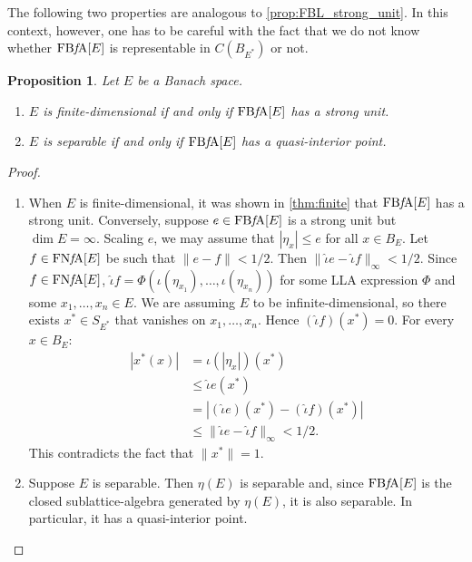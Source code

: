 \documentclass{memo-l}
\newtheorem{prop}[theorem]{Proposition}
\theoremstyle{definition}
\theoremstyle{remark}
\numberwithin{section}{chapter}
\numberwithin{equation}{chapter}
\newcommand{\FNFA}[1]{\operatorname{FN{\it f}\!A}[#1]}
\newcommand{\FBFA}[1]{\operatorname{FB{\it f}\!A}[#1]}
\begin{document}
The following two properties are analogous to
\cref{prop:FBL_strong_unit}. In this context, however, one has to
be careful with the fact that we do not know whether $\FBFA E$ is
representable in $C(B_{E^{*}})$ or not.

\begin{prop} Let $E$ be a Banach space.
    \begin{enumerate}
        \item $E$ is finite-dimensional if and only if $\FBFA E$ has a
            strong unit.
        \item $E$ is separable if and only if $\FBFA E$ has a quasi-interior point.
    \end{enumerate}
\end{prop}
\begin{proof}
    \begin{enumerate}
        \item When $E$ is finite-dimensional, it was shown in
            \cref{thm:finite} that $\FBFA E$ has a strong unit.
            Conversely, suppose $e \in \FBFA E$ is a strong unit but
            $\dim E=\infty$. Scaling $e$, we may assume that $|\eta _x|\le
            e$ for all $x \in B_E$. Let
            $f \in \FNFA E$ be such that $\|e-f\|<1/2$. Then $\|\hat{\iota }e-\hat{\iota }f\|_\infty <1/2$.
            Since $f \in \FNFA E$, $\hat{\iota }f=\Phi (\iota (\eta
            _{x_1}),\ldots ,\iota (\eta
            _{x_n}))$ for some LLA expression $\Phi $ and some
            $x_1,\ldots ,x_n \in E$. We are assuming $E$ to be
            infinite-dimensional, so there exists $x^{*}\in S_{E^{*}}$ that
            vanishes on $x_1,\ldots ,x_n$. Hence $(\hat{\iota }f)(x^{*})=0$. For every $x \in B_{E}$:
            \begin{align*}
                |x^{*}(x)|&=\iota (|\eta _x|)(x^{*})\\&\le
                \hat{\iota }e(x^{*})\\&=|(\hat{\iota
                }e)(x^{*})-(\hat{\iota} f)(x^{*})|\\&\le
                \|\hat{\iota }e-\hat{\iota }{f}\|_\infty
                <1/2.
            \end{align*}
            This contradicts the fact that $\|x^{*}\|=1$.
        \item Suppose $E$ is separable. Then $\eta (E)$ is
            separable and, since $\FBFA E$ is the closed
            sublattice-algebra generated by $\eta (E)$, it is also
            separable. In particular, it has a quasi-interior point.


\end{enumerate}
\end{proof}
\end{document}
